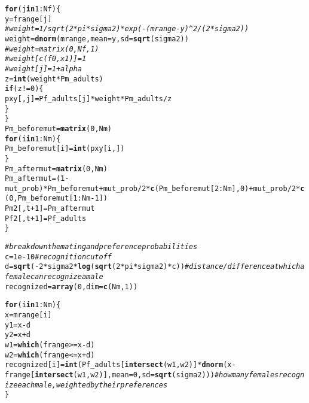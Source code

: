 \documentclass{article}\usepackage[]{graphicx}\usepackage[]{color}
\makeatletter
\newcommand{\hlnum}[1]{\textcolor[rgb]{0.686,0.059,0.569}{#1}}%
\newcommand{\hlcom}[1]{\textcolor[rgb]{0.678,0.584,0.686}{\textit{#1}}}%
\newcommand{\hlopt}[1]{\textcolor[rgb]{0,0,0}{#1}}%
\newcommand{\hlstd}[1]{\textcolor[rgb]{0.345,0.345,0.345}{#1}}%
\newcommand{\hlkwa}[1]{\textcolor[rgb]{0.161,0.373,0.58}{\textbf{#1}}}%
\newcommand{\hlkwb}[1]{\textcolor[rgb]{0.69,0.353,0.396}{#1}}%
\newcommand{\hlkwc}[1]{\textcolor[rgb]{0.333,0.667,0.333}{#1}}%
\newcommand{\hlkwd}[1]{\textcolor[rgb]{0.737,0.353,0.396}{\textbf{#1}}}%
\newenvironment{kframe}{%
 \def\at@end@of@kframe{}%
 \ifinner\ifhmode%
  \def\at@end@of@kframe{\end{minipage}}%
  \begin{minipage}{\columnwidth}%
 \fi\fi%
 \def\FrameCommand##1{\hskip\@totalleftmargin \hskip-\fboxsep
 \colorbox{shadecolor}{##1}\hskip-\fboxsep
     \hskip-\linewidth \hskip-\@totalleftmargin \hskip\columnwidth}%
 \MakeFramed {\advance\hsize-\width
   \@totalleftmargin\z@ \linewidth\hsize
   \@setminipage}}%
 {\par\unskip\endMakeFramed%
 \at@end@of@kframe}
\newenvironment{knitrout}{}{} %
\makeatother
\begin{document}
\begin{knitrout}
\begin{kframe}
\begin{alltt}
        \hlkwa{for}\hlstd{(j} \hlkwa{in} \hlnum{1}\hlopt{:}\hlstd{Nf)\{}
                \hlstd{y} \hlkwb{=} \hlstd{frange[j]}
                \hlcom{# weight = 1/sqrt(2*pi*sigma2)*exp(-(mrange-y)^2/(2*sigma2))}
                \hlstd{weight} \hlkwb{=} \hlkwd{dnorm}\hlstd{(mrange,}\hlkwc{mean}\hlstd{=y,}\hlkwc{sd}\hlstd{=}\hlkwd{sqrt}\hlstd{(sigma2))}
                \hlcom{# weight = matrix (0,Nf,1)}
                \hlcom{# weight[c(f0,x1)] = 1}
                \hlcom{# weight[j] = 1+alpha}
                \hlstd{z} \hlkwb{=} \hlkwd{int}\hlstd{(weight}\hlopt{*}\hlstd{Pm_adults)}
                \hlkwa{if}\hlstd{(z}\hlopt{!=}\hlnum{0}\hlstd{)\{}
                        \hlstd{pxy[,j]} \hlkwb{=} \hlstd{Pf_adults[j]}\hlopt{*}\hlstd{weight}\hlopt{*}\hlstd{Pm_adults}\hlopt{/}\hlstd{z}
                        \hlstd{\}}
        \hlstd{\}}
        \hlstd{Pm_beforemut} \hlkwb{=} \hlkwd{matrix}\hlstd{(}\hlnum{0}\hlstd{,Nm)}
        \hlkwa{for}\hlstd{(i} \hlkwa{in} \hlnum{1}\hlopt{:}\hlstd{Nm)\{}
                \hlstd{Pm_beforemut[i]} \hlkwb{=} \hlkwd{int}\hlstd{(pxy[i,])}
        \hlstd{\}}
        \hlstd{Pm_aftermut} \hlkwb{=} \hlkwd{matrix}\hlstd{(}\hlnum{0}\hlstd{,Nm)}
        \hlstd{Pm_aftermut} \hlkwb{=} \hlstd{(}\hlnum{1}\hlopt{-}\hlstd{mut_prob)}\hlopt{*}\hlstd{Pm_beforemut} \hlopt{+} \hlstd{mut_prob}\hlopt{/}\hlnum{2}\hlopt{*}\hlkwd{c}\hlstd{(Pm_beforemut[}\hlnum{2}\hlopt{:}\hlstd{Nm],}\hlnum{0}\hlstd{)} \hlopt{+} \hlstd{mut_prob}\hlopt{/}\hlnum{2}\hlopt{*}\hlkwd{c}\hlstd{(}\hlnum{0}\hlstd{,Pm_beforemut[}\hlnum{1}\hlopt{:}\hlstd{Nm}\hlopt{-}\hlnum{1}\hlstd{])}
        \hlstd{Pm2[,t}\hlopt{+}\hlnum{1}\hlstd{]} \hlkwb{=} \hlstd{Pm_aftermut}
        \hlstd{Pf2[,t}\hlopt{+}\hlnum{1}\hlstd{]} \hlkwb{=} \hlstd{Pf_adults}
\hlstd{\}}

\hlcom{# break down the mating and preference probabilities}
\hlstd{c} \hlkwb{=} \hlnum{1e-10} \hlcom{#recognition cutoff}
\hlstd{d} \hlkwb{=} \hlkwd{sqrt}\hlstd{(}\hlopt{-}\hlnum{2}\hlopt{*}\hlstd{sigma2}\hlopt{*}\hlkwd{log}\hlstd{(}\hlkwd{sqrt}\hlstd{(}\hlnum{2}\hlopt{*}\hlstd{pi}\hlopt{*}\hlstd{sigma2)}\hlopt{*}\hlstd{c))} \hlcom{#distance / difference at which a female can recognize a male}
\hlstd{recognized} \hlkwb{=} \hlkwd{array}\hlstd{(}\hlnum{0}\hlstd{,}\hlkwc{dim}\hlstd{=}\hlkwd{c}\hlstd{(Nm,}\hlnum{1}\hlstd{))}

\hlkwa{for}\hlstd{(i} \hlkwa{in} \hlnum{1}\hlopt{:}\hlstd{Nm)\{}
        \hlstd{x} \hlkwb{=} \hlstd{mrange[i]}
        \hlstd{y1} \hlkwb{=} \hlstd{x} \hlopt{-} \hlstd{d}
        \hlstd{y2} \hlkwb{=} \hlstd{x} \hlopt{+} \hlstd{d}
        \hlstd{w1} \hlkwb{=} \hlkwd{which}\hlstd{(frange}\hlopt{>=}\hlstd{x}\hlopt{-}\hlstd{d)}
        \hlstd{w2} \hlkwb{=} \hlkwd{which}\hlstd{(frange}\hlopt{<=}\hlstd{x}\hlopt{+}\hlstd{d)}
        \hlstd{recognized[i]} \hlkwb{=} \hlkwd{int}\hlstd{(Pf_adults[}\hlkwd{intersect}\hlstd{(w1,w2)]}\hlopt{*}\hlkwd{dnorm}\hlstd{(x}\hlopt{-}\hlstd{frange[}\hlkwd{intersect}\hlstd{(w1,w2)],}\hlkwc{mean}\hlstd{=}\hlnum{0}\hlstd{,}\hlkwc{sd}\hlstd{=}\hlkwd{sqrt}\hlstd{(sigma2)))} \hlcom{#how many females recognize each male, weighted by their preferences}
\hlstd{\}}


\end{alltt}
\end{kframe}
\end{knitrout}
\end{document}
